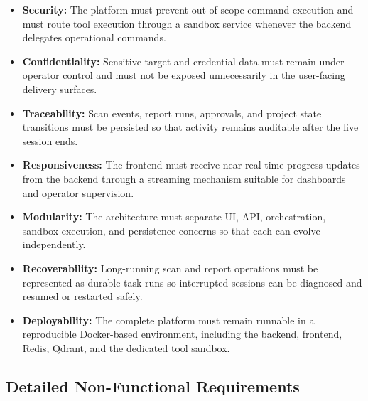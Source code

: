 \documentclass[12pt,a4paper]{report}
\begin{document}
\begin{itemize}
    \item \textbf{Security:} The platform must prevent out-of-scope command
    execution and must route tool execution through a sandbox service whenever
    the backend delegates operational commands.

    \item \textbf{Confidentiality:} Sensitive target and credential data must
    remain under operator control and must not be exposed unnecessarily in the
    user-facing delivery surfaces.

    \item \textbf{Traceability:} Scan events, report runs, approvals, and
    project state transitions must be persisted so that activity remains
    auditable after the live session ends.

    \item \textbf{Responsiveness:} The frontend must receive near-real-time
    progress updates from the backend through a streaming mechanism suitable
    for dashboards and operator supervision.

    \item \textbf{Modularity:} The architecture must separate UI, API,
    orchestration, sandbox execution, and persistence concerns so that each
    can evolve independently.

    \item \textbf{Recoverability:} Long-running scan and report operations
    must be represented as durable task runs so interrupted sessions can be
    diagnosed and resumed or restarted safely.

    \item \textbf{Deployability:} The complete platform must remain runnable
    in a reproducible Docker-based environment, including the backend,
    frontend, Redis, Qdrant, and the dedicated tool sandbox.
\end{itemize}

\subsection{Detailed Non-Functional Requirements}
\end{document}
